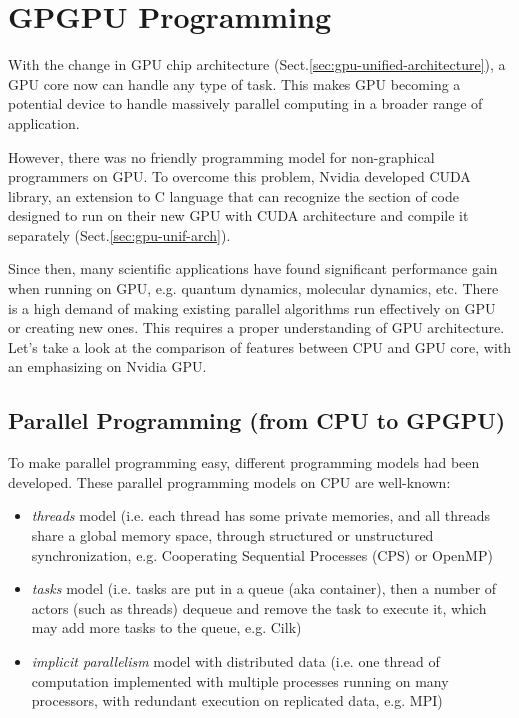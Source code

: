 
\chapter{GPGPU Programming}
\label{chap:gpu-programming}

With the change in GPU chip architecture
(Sect.\ref{sec:gpu-unified-architecture}), a GPU core now can handle any type of
task. This makes GPU becoming a potential device to handle massively parallel
computing in a broader range of application.

However, there was no friendly programming model for non-graphical programmers
on GPU. To overcome this problem, Nvidia developed CUDA library, an extension to
C language that can recognize the section of code designed to run on their new
GPU with CUDA architecture and compile it separately
(Sect.\ref{sec:gpu-unif-arch}).

Since then, many scientific applications have found significant performance gain
when running on GPU, e.g. quantum dynamics, molecular dynamics, etc. There is a
high demand of making existing parallel algorithms run effectively on GPU or
creating new ones. This requires a proper understanding of GPU architecture.
Let's take a look at the comparison of features between CPU and GPU core,
with an emphasizing on Nvidia GPU.

\section{Parallel Programming (from CPU to GPGPU)}
\label{sec:progr-with-cpugpgpu}

To make parallel programming easy, different programming models had
been developed. These parallel programming models on CPU are well-known:
\begin{itemize}
\item {\it threads} model (i.e. each thread has some private memories,
  and all threads share a global memory space, through structured or
  unstructured synchronization, e.g. Cooperating Sequential Processes
  (CPS) or OpenMP)

\item {\it tasks} model (i.e. tasks are put in a queue (aka
  container), then a number of actors (such as threads) dequeue and
  remove the task to execute it, which may add more tasks to the
  queue, e.g. Cilk)

\item {\it implicit parallelism} model with distributed data (i.e. one
  thread of computation implemented with multiple processes running on
  many processors, with redundant execution on replicated data,
  e.g. MPI)

\end{itemize}

